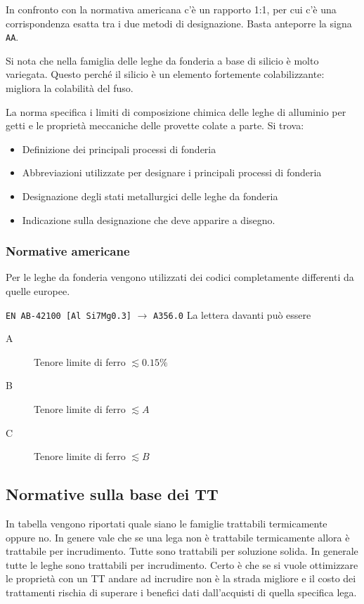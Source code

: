 

In confronto con la normativa americana c'è un rapporto 1:1, per cui c'è una corrispondenza esatta tra i due metodi di designazione. Basta anteporre la signa \texttt{AA}.

Si nota che nella famiglia delle leghe da fonderia a base di silicio è molto variegata. Questo perché il silicio è un elemento fortemente colabilizzante: migliora la colabilità del fuso.

La norma specifica i limiti di composizione chimica delle leghe di alluminio per getti e le proprietà meccaniche delle provette colate a parte.
Si trova:
\begin{itemize}
\item Definizione dei principali processi di fonderia
\item Abbreviazioni utilizzate per designare i principali processi di fonderia
\item Designazione degli stati metallurgici delle leghe da fonderia
\item Indicazione sulla designazione che deve apparire a disegno.
\end{itemize}

\subsubsection{Normative americane}
Per le leghe da fonderia vengono utilizzati dei codici completamente differenti da quelle europee.

\texttt{EN AB-42100 [Al Si7Mg0.3]} $\rightarrow$ \texttt{A356.0}
La lettera davanti può essere
\begin{description}
\item[A] Tenore limite di ferro $\lesssim 0.15\%$
\item[B] Tenore limite di ferro $\lesssim A$
\item[C] Tenore limite di ferro $\lesssim B$
\end{description}

\subsection{Normative sulla base dei TT}
In tabella vengono riportati quale siano le famiglie trattabili termicamente oppure no.
In genere vale che se una lega non è trattabile termicamente allora è trattabile per incrudimento.
Tutte sono trattabili per soluzione solida.
In generale tutte le leghe sono trattabili per incrudimento. Certo è che se si vuole ottimizzare le proprietà con un \ac{TT} andare ad incrudire non è la strada migliore e il costo dei trattamenti rischia di superare i benefici dati dall'acquisti di quella specifica lega.

